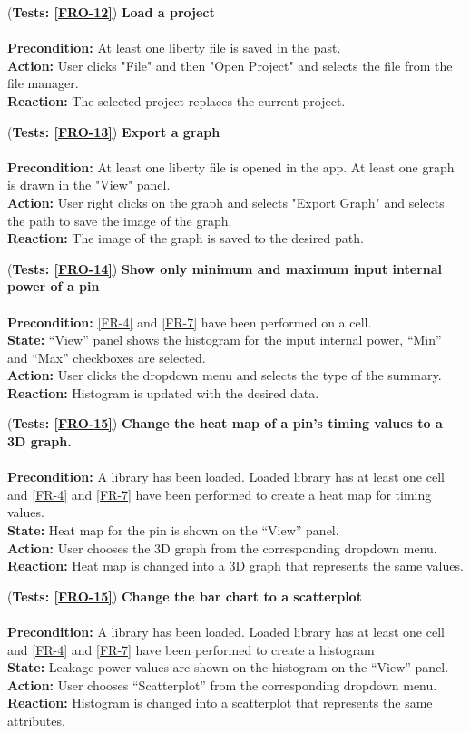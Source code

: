 \documentclass[10pt,a4paper]{report}
\newcommand{\precondition}[1]{
    \textbf{Precondition: } #1 \leavevmode \\
}
\newcommand{\action}[1]{
    \textbf{Action: } #1 \leavevmode \\
}
\newcommand{\state}[1]{
    \textbf{State: } #1 \leavevmode \\
}
\newcommand{\reaction}[1]{
    \textbf{Reaction: } #1 \leavevmode \\
}
\newcommand{\GTCODescription}[2]{
    (\textbf{Tests: #1}) \textbf{#2} \leavevmode \\
}
\begin{document}
\begin{GTCO}
    \item \GTCODescription{\ref{FRO-12}}
    {Load a project} \leavevmode \\ 
        \precondition{At least one liberty file is saved in the past.}
        \action{User clicks "File" and then "Open Project" and selects the file from the file manager.}
        \reaction{The selected project replaces the current project.}\label{GTCO-12}
    
    \item \GTCODescription{\ref{FRO-13}}
    {Export a graph} \leavevmode \\ 
        \precondition{At least one liberty file is opened in the app. At least one graph is drawn in the "View" panel.}
        \action{User right clicks on the graph and selects "Export Graph" and selects the path to save the image of the graph.}
        \reaction{The image of the graph is saved to the desired path.}\label{GTCO-13}
    
    \item \GTCODescription{\ref{FRO-14}}
    {Show only minimum and maximum input internal power of a pin} \leavevmode \\ 
        \precondition{\ref{FR-4} and \ref{FR-7} have been performed on a cell.}
        \state{“View” panel shows the histogram for the input internal power, “Min” and “Max” checkboxes are selected.}
        \action{User clicks the dropdown menu and selects the type of the summary.}
        \reaction{Histogram is updated with the desired data.}\label{GTCO-14}
  
   \item \GTCODescription{\ref{FRO-15}}
   {Change the heat map of a pin’s timing values to a 3D graph.} \leavevmode \\ 
        \precondition{A library has been loaded. Loaded library has at least one cell and \ref{FR-4} and \ref{FR-7} have been performed to create a heat map for timing values.}
        \state{Heat map for the pin is shown on the “View” panel.}
        \action{User chooses the 3D graph from the corresponding dropdown menu.}
        \reaction{Heat map is changed into a 3D graph that represents the same values.}\label{GTCO-15}
    
    \item \GTCODescription{\ref{FRO-15}}
    {Change the bar chart to a scatterplot} \leavevmode \\ 
        \precondition{A library has been loaded. Loaded library has at least one cell and \ref{FR-4} and \ref{FR-7} have been performed to create a histogram}
        \state{Leakage power values are shown on the histogram on the “View” panel.}
        \action{User chooses “Scatterplot” from the corresponding dropdown menu.}
        \reaction{Histogram is changed into a scatterplot that represents the same attributes.}\label{GTCO-16}
    

\end{GTCO}
\end{document}
